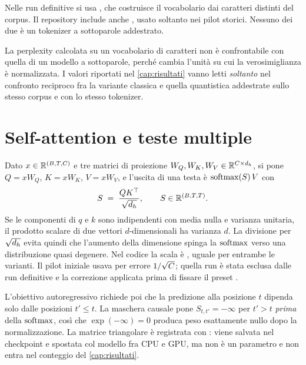 Nelle run definitive si usa , che costruisce il vocabolario
dai caratteri distinti del corpus. Il repository include anche
, usato soltanto nei pilot storici. Nessuno dei due è un
tokenizer a sottoparole addestrato.

\begin{limite}
La perplexity calcolata su un vocabolario di caratteri non è confrontabile con
quella di un modello a sottoparole, perché cambia l'unità su cui la
verosimiglianza è normalizzata. I valori riportati nel \cref{cap:risultati} vanno
letti \emph{soltanto} nel confronto reciproco fra la variante classica e quella
quantistica addestrate sullo stesso corpus e con lo stesso tokenizer.
\end{limite}

\section{Self-attention e teste multiple}
\label{sec:self-attention}

Dato $x \in \mathbb{R}^{(B, T, C)}$ e tre matrici di proiezione
$W_Q, W_K, W_V \in \mathbb{R}^{C \times d_h}$, si pone $Q = xW_Q$, $K = xW_K$,
$V = xW_V$, e l'uscita di una testa è $\operatorname{softmax}(S)\,V$ con
\begin{equation}
  S \;=\; \frac{QK^{\top}}{\sqrt{d_h}} ,
  \qquad S \in \mathbb{R}^{(B, T, T)} .
  \label{eq:scores}
\end{equation}
Se le componenti di $q$ e $k$ sono indipendenti con media nulla e varianza
unitaria, il prodotto scalare di due vettori $d$-dimensionali ha varianza $d$.
La divisione per $\sqrt{d_h}$ evita quindi che l'aumento della dimensione
spinga la $\operatorname{softmax}$ verso una distribuzione quasi degenere. Nel
codice la scala è , uguale per entrambe le
varianti. Il pilot iniziale usava per errore $1/\sqrt{C}$; quella run è stata
esclusa dalle run definitive e la correzione applicata prima di fissare il preset
.

L'obiettivo autoregressivo richiede poi che la predizione alla posizione $t$
dipenda solo dalle posizioni $t' \le t$. La maschera causale pone $S_{t,t'} =
-\infty$ per $t' > t$ \emph{prima} della $\operatorname{softmax}$, così che $\exp(-\infty) = 0$
produca peso esattamente nullo dopo la normalizzazione. La matrice triangolare è
registrata con : viene salvata nel checkpoint e spostata
col modello fra CPU e GPU, ma non è un parametro e non entra nel conteggio del
\cref{cap:risultati}.

